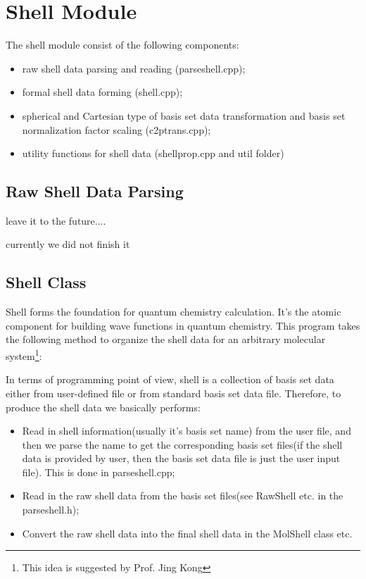 %
%
%
\chapter{Shell Module}
%
%
%
The shell module consist of the following components:
\begin{itemize}
 \item raw shell data parsing and reading (parseshell.cpp);
 \item formal shell data forming (shell.cpp);
 \item spherical and Cartesian type of basis set data transformation
 and basis set normalization factor scaling (c2ptrans.cpp);
 \item utility functions for shell data (shellprop.cpp and util folder)
\end{itemize}

\section{Raw Shell Data Parsing}

leave it to the future....

currently we did not finish it

\section{Shell Class}
%
%
%
Shell forms the foundation for quantum chemistry calculation. It's the atomic
component for building wave functions in quantum chemistry. This program
takes the following method to organize the shell data for an arbitrary molecular 
system\footnote{This idea is suggested by Prof. Jing Kong}:


In terms of 
programming point of view, shell is a collection of basis set data
either from user-defined file or from standard basis set data file. Therefore,
to produce the shell data we basically performs: 
\begin{itemize}
\item Read in shell information(usually it's basis set name) from the 
user file, and then we parse the name to get the corresponding basis set
files(if the shell data is provided by user, then the basis set data 
file is just the user input file). This is done in parseshell.cpp;
\item Read in the raw shell data from the basis set files(see RawShell etc. 
in the parseshell.h);
\item Convert the raw shell data into the final shell data in the MolShell class etc.
\end{itemize}

